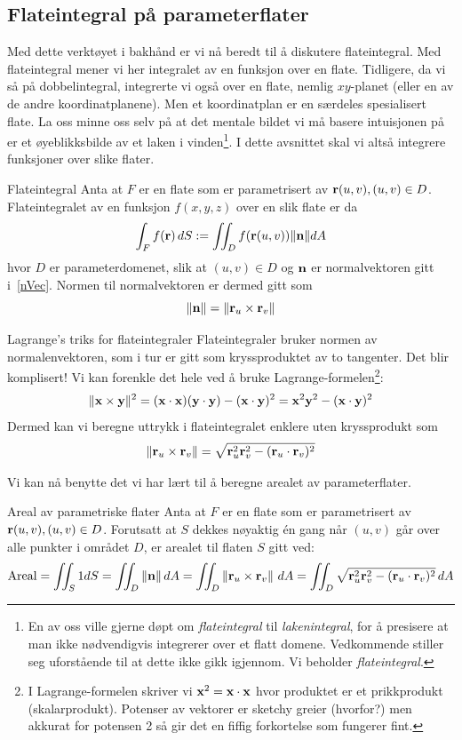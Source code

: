 \subsection{Flateintegral på parameterflater}
Med dette verktøyet i bakhånd er vi nå beredt til å diskutere flateintegral. Med flateintegral mener vi her integralet av en funksjon over en flate. Tidligere, da vi så på dobbelintegral, integrerte vi også over en flate, nemlig $xy$-planet (eller en av de andre koordinatplanene). Men et koordinatplan er en særdeles spesialisert flate. La oss minne oss selv på at det mentale bildet vi må basere intuisjonen på er et øyeblikksbilde av et laken i vinden\footnote{En av oss ville gjerne døpt om \textit{flateintegral} til \textit{lakenintegral}, for å presisere at man ikke nødvendigvis integrerer over et flatt domene. Vedkommende stiller seg uforstående til at dette ikke gikk igjennom. Vi beholder \textit{flateintegral}.}. I dette avsnittet skal vi altså integrere funksjoner over slike flater.
\begin{defn}{Flateintegral}
Anta at \( F \) er en flate som er parametrisert av $\mathbf{r}(u, v) , (u,v)\in D$. Flateintegralet av en  funksjon $f(x,y,z)$ over en slik flate er da
\[\int_F f(\mathbf{r})\, dS := \iint_D f(\mathbf{r}(u,v))\lVert \mathbf{n}\rVert dA\]
hvor $D$ er parameterdomenet, slik at $(u,v)\in D$ og $\mathbf{n}$ er normalvektoren gitt i~\eqref{nVec}. Normen til normalvektoren er dermed gitt som 
\[\lVert \mathbf{n}\rVert=\lVert\mathbf{r}_u \times \mathbf{r}_v\rVert\]
\label{defn:flateintegral}
\end{defn}

\begin{oppsum}{Lagrange's triks for flateintegraler}
Flateintegraler bruker normen av normalenvektoren, som i tur er gitt som kryssproduktet av to tangenter. Det blir komplisert! Vi kan forenkle det hele ved å bruke Lagrange-formelen\footnote{I Lagrange-formelen skriver vi $\mathbf{x}^2 = \mathbf{x}\cdot \mathbf{x}$ hvor produktet er et prikkprodukt (skalarprodukt). Potenser av vektorer er sketchy greier (hvorfor?) men akkurat for potensen 2 så gir det en fiffig forkortelse som fungerer fint.}:
\[\lVert \mathbf{x} \times \mathbf{y}\rVert^2 = (\mathbf{x}\cdot \mathbf{x})(\mathbf{y}\cdot \mathbf{y})-(\mathbf{x}\cdot \mathbf{y})^2=\mathbf{x}^2\mathbf{y}^2-(\mathbf{x}\cdot \mathbf{y})^2\]
Dermed kan vi beregne uttrykk i flateintegralet enklere uten kryssprodukt som
\[\lVert \mathbf{r}_u \times \mathbf{r}_v\rVert=\sqrt{\mathbf{r}_u^2 \mathbf{r}_v^2 - (\mathbf{r}_u \cdot \mathbf{r}_v)^2}\]
\end{oppsum}
Vi kan nå benytte det vi har lært til å beregne arealet av parameterflater. 
\begin{defn}{Areal av parametriske flater}
Anta at \( F \) er en flate som er parametrisert av
$\mathbf{r}(u, v) , (u,v)\in D$. 
Forutsatt at \( S \) dekkes nøyaktig én gang når \( (u, v) \) går over alle punkter i området \( D \), er arealet til flaten \( S \) gitt ved:
\begin{align}\label{surfacearea}
\textrm{Areal} = \iint_S 1 dS = \iint_D\left\|\mathbf{n}\right\|dA=\iint_D \left\| \mathbf{r}_u \times \mathbf{r}_v \right\|\, dA = \iint_D \sqrt{\mathbf{r}_u^2  \mathbf{r}_v^2 - (\mathbf{r}_u \cdot \mathbf{r}_v)^2}\, dA
\end{align}
\end{defn}

